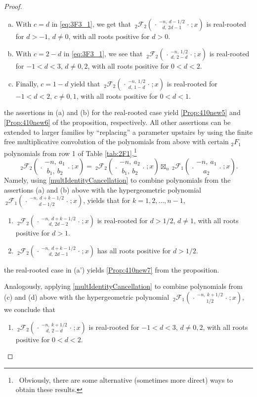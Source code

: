 \documentclass[reqno,11pt]{amsart}
\theoremstyle{remark}
\newcommand*\pFq[5]{%
 {\ }_{#1}{\mathcal F}_{#2}{\left(\genfrac..{0pt}{}{#3}{#4};#5\right)}%
}
\begin{document}
\begin{proof}
\begin{enumerate}[(a)]
    \item With  $c=d$ in \eqref{eq:3F3_1}, we get that $
    \pFq{2}{2}{-n,\ d- 1/2}{d,\ 2d-1}{x}
    $
 is real-rooted for $d>-1$, $d\neq 0$, with all roots positive for $d>0$.
    \item With $c=2-d$ in \eqref{eq:3F3_1}, we see that  $
    \pFq{2}{2}{-n,\ 1/2}{d,\ 2-d}{x}
    $
    is real-rooted for $-1<d<3$, $d\neq 0, 2$, with all roots positive for $0<d<2$.
    \item Finally, $c=1-d$ yield that $
    \pFq{2}{2}{-n,\ 1/2}{d,\ 1-d}{x}
    $
    is real-rooted for $-1<d<2$, $c\neq 0, 1$, with all roots positive for $0<d<1$. 
 \end{enumerate}    
 the assertions in (a) and (b) for the real-rooted case yield \eqref{Prop:410new5} and \eqref{Prop:410new6} of the proposition, respectively. All other assertions can be extended to larger families by ``replacing'' a parameter upstairs by using the finite free multiplicative convolution of the polynomials from above with certain ${}_2 F_1$ polynomials from row 1 of Table \ref{tab:2F1},\footnote{\, Obviously, there are some alternative (sometimes more direct) ways to obtain these results.}
\begin{equation}
    \label{multIdentityCancellation}
    \pFq{2}{2}{-n,\ a_1}{b_1,\ b_2}{x}=\pFq{2}{2}{-n,\ a_2}{b_1, \ b_2}{x} \boxtimes_n \pFq{2}{1}{-n, \ a_1 }{a_2 }{x}.
\end{equation}
Namely, using \eqref{multIdentityCancellation} to combine polynomials from the assertions (a) and (b) above with the hypergeometric polynomial 
$\pFq{2}{1}{-n,\ d+k-1/2}{ d-1/2}{x}$, yields that for $k=1,2,\dots,n-1$,
\begin{enumerate} 
    \item[(a')] \label{2F2-1c} 
    $
    \pFq{2}{2}{-n,\ d+k-1/2}{d,\ 2d-2}{x}
    $
    is real-rooted for $d>1/2$, $d\neq 1$, with all roots positive for $d>1$.

    \item[(b')] \label{2F2-2c} 
    $
    \pFq{2}{2}{-n,\ d+k- 1/2}{d,\ 2d-1}{x}
    $
    has all roots positive for $d>1/2$.
\end{enumerate}   
the real-rooted case in (a') yields \eqref{Prop:410new7} from the proposition. 

Analogously, applying \eqref{multIdentityCancellation} to combine polynomials from (c) and (d) above with the hypergeometric polynomial  $\pFq{2}{1}{-n,\ k+1/2}{ 1/2}{x}$, we conclude that
 \begin{enumerate} 
      \item[(c')]  
    $
    \pFq{2}{2}{-n,\ k+1/2}{d,\ 2-d}{x}
    $
    is real-rooted for $-1<d<3$, $d\neq 0, 2$, with all roots positive for $0<d<2$.
    

\end{enumerate}
\end{proof}
\end{document}

